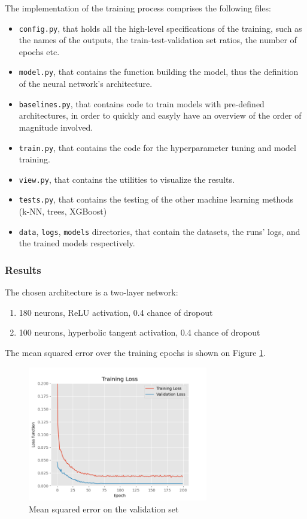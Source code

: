 The implementation of the training process comprises the following files:
\begin{itemize}
    \item \texttt{config.py}, that holds all the high-level specifications of the training, such as the names of the outputs, the train-test-validation set ratios, the number of epochs etc.
    \item \texttt{model.py}, that contains the function building the model, thus the definition of the neural network's architecture.
    \item \texttt{baselines.py}, that contains code to train models with pre-defined architectures, in order to quickly and easyly have an overview of the order of magnitude involved.
    \item \texttt{train.py}, that contains the code for the hyperparameter tuning and model training.
    \item \texttt{view.py}, that contains the utilities to visualize the results.
    \item \texttt{tests.py}, that contains the testing of the other machine learning methods (k-NN, trees, XGBoost)
    \item \texttt{data}, \texttt{logs}, \texttt{models} directories, that contain the datasets, the runs' logs, and the trained models respectively.
\end{itemize}

\subsubsection{Results}

The chosen architecture is a two-layer network:
\begin{enumerate}
    \item 180 neurons, ReLU activation, 0.4 chance of dropout
    \item 100 neurons, hyperbolic tangent activation, 0.4 chance of dropout
\end{enumerate}

The mean squared error over the training epochs is shown on Figure \ref{fig:nn-validation-error-curve}.

\begin{figure}[h]
    \centering
    \includegraphics[width=0.7\textwidth]{resources/images/mse-finalarch.png}
    \caption{Mean squared error on the validation set}
    \label{fig:nn-validation-error-curve}
\end{figure}

